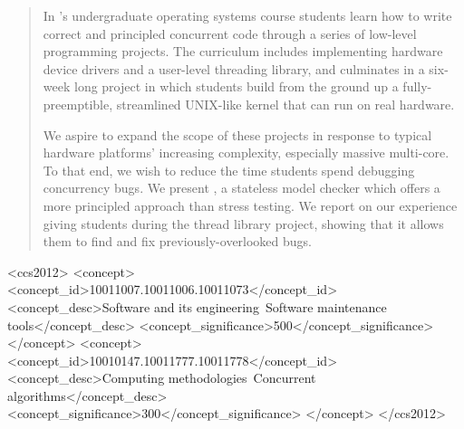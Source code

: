 \documentclass{sig-alternate-05-2015}
\begin{document}
\maketitle
\begin{abstract}

In \carnegiemellon's undergraduate operating systems course
students learn how to write correct and principled concurrent code through
a series of low-level programming projects.
The curriculum includes implementing hardware device drivers and a user-level
threading library, and culminates in a six-week long project in which students
build from the ground up a fully-preemptible, streamlined UNIX-like kernel that can run
on real hardware.

We aspire to expand the scope of these projects in response to
typical hardware platforms'
increasing complexity,
especially massive multi-core.
To that end, we wish to reduce the time students spend
debugging concurrency bugs.
We present \landslide, a
stateless model checker which
offers a more principled approach than stress testing.
We report on our experience giving students \landslide during the thread library
project,
showing that it allows them to find and fix previously-overlooked bugs.

\end{abstract}

\begin{CCSXML}
	 <ccs2012>
	 <concept>
	 <concept_id>10011007.10011006.10011073</concept_id>
	 <concept_desc>Software and its engineering~Software maintenance tools</concept_desc>
	 <concept_significance>500</concept_significance>
	 </concept>
	 <concept>
	 <concept_id>10010147.10011777.10011778</concept_id>
	 <concept_desc>Computing methodologies~Concurrent algorithms</concept_desc>
	 <concept_significance>300</concept_significance>
	 </concept>
	 </ccs2012>
\end{CCSXML}
\end{document}
